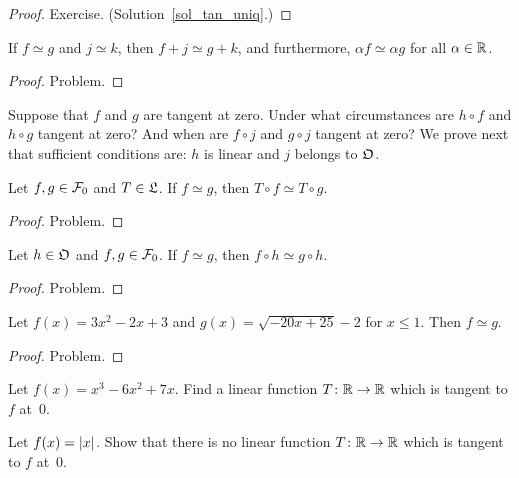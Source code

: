 \begin{proof} Exercise.  (Solution~\ref{sol_tan_uniq}.)   \ns \end{proof}

\begin{prop}\label{tan_alg} If $f \simeq g$ and $j \simeq k$, then $f + j \simeq g + k$,
and furthermore, $\alpha f \simeq \alpha g$ for all $\alpha \in \mathbb{R}$.
\end{prop}

\begin{proof} Problem. \ns \end{proof}

Suppose that $f$ and $g$ are tangent at zero. Under what circumstances are $h \circ f$ and $h
\circ g$ tangent at zero? And when are $f \circ j$ and $g \circ j$ tangent at zero? We prove
next that sufficient conditions are: $h$ is linear and $j$ belongs to $\mathfrak{O}$.

\begin{prop}\label{L_tan} Let $f,g \in \mathcal{F}_0$ and $T \in \mathfrak{L}$. If $f \simeq g$, then
$T \circ f \simeq T \circ g$.
\end{prop}

\begin{proof} Problem. \ns \end{proof}

\begin{prop}\label{tan_O} Let $h \in \mathfrak{O}$ and $f,g \in \mathcal{F}_0$. If $f \simeq g$, then
$f \circ h \simeq g \circ h$.
\end{prop}

\begin{proof} Problem. \ns \end{proof}

\begin{exam} Let $f(x) = 3x^2 - 2x + 3$ and $g(x) = \sqrt{-20x + 25} - 2$ for $x \le 1$.
Then $f \simeq g$.
\end{exam}

\begin{proof} Problem.  \ns \end{proof}

\begin{prob} Let $f(x) = x^3 - 6x^2 + 7x$. Find a linear function $T \colon \mathbb{R} \rightarrow \mathbb{R}$
which is tangent to $f$ at~0.
\end{prob}

\begin{prob} Let $f(x) = \lvert x\rvert$. Show that there is no linear function $T \colon \mathbb{R} \rightarrow \mathbb{R}$
which is tangent to $f$ at~$0$.
\end{prob}

